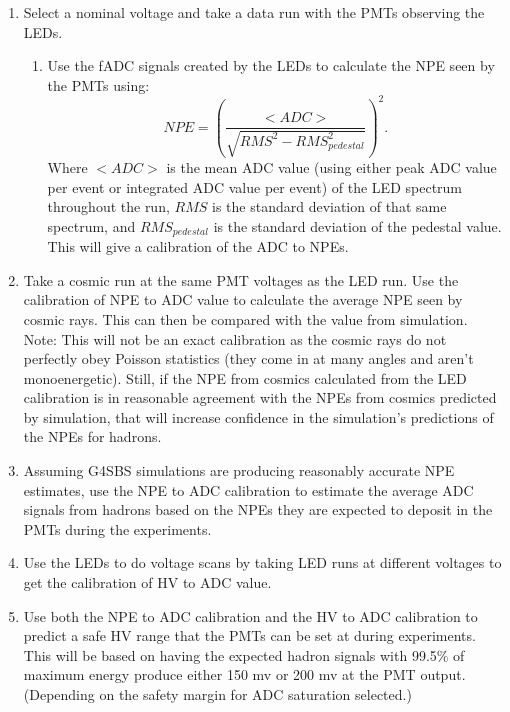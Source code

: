 \documentclass[10pt]{article}
\begin{document}
\begin{enumerate}
	\item Select a nominal voltage and take a data run with the PMTs observing the LEDs.
		\begin{enumerate}
			\item Use the fADC signals created by the LEDs to calculate the NPE seen by the PMTs using:
			\begin{equation}
				NPE = \left( \frac{<ADC>}{\sqrt{RMS^2-RMS_{pedestal}^2}} \right)^2.
			\end{equation}
			Where $<ADC>$ is the mean ADC value (using either peak ADC value per event or integrated ADC value per event) of the LED spectrum throughout the run, $RMS$ is the standard deviation of that same spectrum, and $RMS_{pedestal}$ is the standard deviation of the pedestal value. This will give a calibration of the ADC to NPEs.
		\end{enumerate}
		\item Take a cosmic run at the same PMT voltages as the LED run. Use the calibration of NPE to ADC value to calculate the average NPE seen by cosmic rays. This can then be compared with the value from simulation. Note: This will not be an exact calibration as the cosmic rays do not perfectly obey Poisson statistics (they come in at many angles and aren't monoenergetic). Still, if the NPE from cosmics calculated from the LED calibration is in reasonable agreement with the NPEs from cosmics predicted by simulation, that will increase confidence in the simulation's predictions of the NPEs for hadrons.
		\item Assuming G4SBS simulations are producing reasonably accurate NPE estimates, use the NPE to ADC calibration to estimate the average ADC signals from hadrons based on the NPEs they are expected to deposit in the PMTs during the experiments.
		\item Use the LEDs to do voltage scans by taking LED runs at different voltages to get the calibration of HV to ADC value.
		\item Use both the NPE to ADC calibration and the HV to ADC calibration to predict a safe HV range that the PMTs can be set at during experiments. This will be based on having the expected hadron signals with 99.5\% of maximum energy produce either 150 mv or 200 mv at the PMT output. (Depending on the safety margin for ADC saturation selected.)
\end{enumerate}
\end{document}
